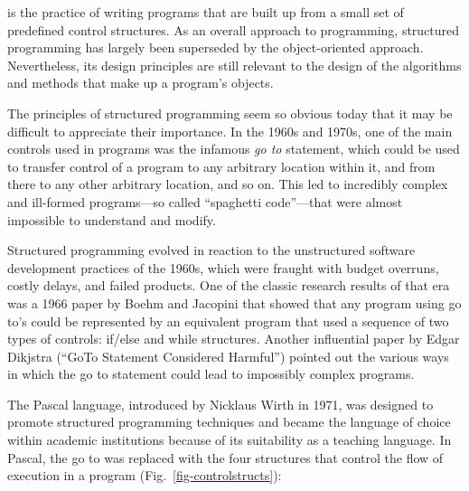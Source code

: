

 is the practice of writing programs that
are built up from a small set of predefined control structures. As an
overall approach to programming, structured programming has largely
been superseded by the object-oriented approach. Nevertheless, its
design principles are still relevant to the design of the
algorithms and methods that make up a program's objects.

The principles of structured programming seem so obvious today that it
may be difficult to appreciate their importance. In the 1960s and 1970s,
one of the main controls used in programs was the infamous
{\it go to} statement, which could be used to transfer
control of a program to any arbitrary location within it, and
from there to any other arbitrary location, and so on. This led to
incredibly complex and ill-formed programs---so called ``spaghetti
code''---that were almost impossible to understand and modify.

Structured programming evolved in reaction to the unstructured
software development practices of the 1960s, which were fraught with
budget overruns, costly delays, and failed products. One of the classic
research results of that era was a 1966 paper by Boehm and
Jacopini that showed that any program using go to's
could be represented by an equivalent program that used a sequence of
two types of controls: if/else and while structures. Another
influential paper by Edgar Dikjstra (``GoTo Statement
Considered Harmful'') pointed out the various ways in which the go to statement
could lead to impossibly complex programs.

The Pascal language, introduced by Nicklaus Wirth in 1971, was
designed to promote structured programming techniques and became the
language of choice within academic institutions because of its
suitability as a teaching language. In Pascal, the go to was replaced
with the four structures that control the flow of execution
in a program (Fig.~\ref{fig-controlstructs}):


\begin{figure}[hbt]
\end{figure}

